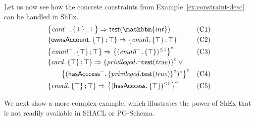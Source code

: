 \begin{example}
Let us now see how the concrete constraints from Example~\ref{ex:constraint-desc} can be handled in ShEx.
\begin{align*}
& \shexneigh{
\shexinverse{\excard}.\shextop \shexeach \shexallte} \Rightarrow   \test(\mathbbm{int})  & \mbox{(C1)} \\
& \shexneigh{\exowns.\shextop \shexeach \shexallte} \Rightarrow \shexneigh{ \exemail.\shextop%
 \shexeach \shexallte} & \mbox{(C2)} \\
&    \shexneigh{\shexinverse{\exemail}.\shextop \shexeach \shexallte} \Rightarrow \shexneighopen{ (\exemail^{-}.\shextop)^{\leq 1}   } & \mbox{(C3)} \\
& \shexneigh{\excard . \shextop \shexeach \shexallte}  \Rightarrow   \shexneighopen{\exprivileged.\neg \shexhasvalue(\mathit{true})} \lor  &  \\
& \qquad \shexneighopen{(\exaccess^{-}.\shexneighopen{\exprivileged.\shexhasvalue(\mathit{true})})^{*} }  & \mbox{(C4)} \\
&  \shexneigh{\exemail.\shextop \shexeach \shexallte}  \Rightarrow \shexneighopen{(\exaccess.\shextop)^{\leq 5}} & \mbox{(C5)}
\end{align*}
\end{example}

We next show a more complex example, which illustrates the power of ShEx that is not readily available in SHACL or PG-Schema.

